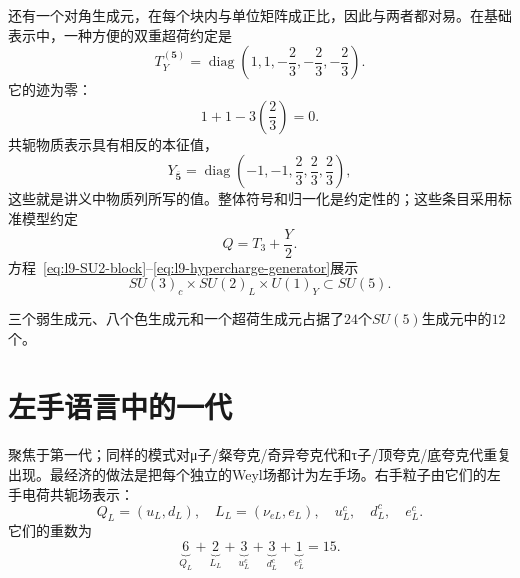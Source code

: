 还有一个对角生成元，在每个块内与单位矩阵成正比，因此与两者都对易。在基础表示中，一种方便的双重超荷约定是
\begin{equation}
T_Y^{(\mathbf5)}=
\operatorname{diag}
\left(
1,1,-\frac23,-\frac23,-\frac23
\right).
\label{eq:l9-hypercharge-generator}
\end{equation}
它的迹为零：
\begin{equation}
1+1-3\left(\frac23\right)=0.
\end{equation}
共轭物质表示具有相反的本征值，
\begin{equation}
Y_{\overline{\mathbf5}}
=
\operatorname{diag}
\left(
-1,-1,\frac23,\frac23,\frac23
\right),
\label{eq:l9-fivebar-hypercharge}
\end{equation}
这些就是讲义中物质列所写的值。整体符号和归一化是约定性的；这些条目采用标准模型约定
\begin{equation}
Q=T_3+\frac{Y}{2}.
\label{eq:l9-charge}
\end{equation}
方程~\eqref{eq:l9-SU2-block}--\eqref{eq:l9-hypercharge-generator}展示
\begin{equation}
SU(3)_c\times SU(2)_L\times U(1)_Y
\subset SU(5).
\end{equation}

三个弱生成元、八个色生成元和一个超荷生成元占据了\(24\)个\(SU(5)\)生成元中的\(12\)个。

\begin{classroomqa}
\end{classroomqa}

\section{左手语言中的一代}

聚焦于第一代；同样的模式对{\proseunicodefont μ}子/粲夸克/奇异夸克代和{\proseunicodefont τ}子/顶夸克/底夸克代重复出现。最经济的做法是把每个独立的Weyl场都计为左手场。右手粒子由它们的左手电荷共轭场表示：
\begin{equation}
Q_L=(u_L,d_L),\quad
L_L=(\nu_{eL},e_L),\quad
u^c_L,\quad d^c_L,\quad e^c_L.
\end{equation}
它们的重数为
\begin{equation}
\underbrace{6}_{Q_L}
+
\underbrace{2}_{L_L}
+
\underbrace{3}_{u^c_L}
+
\underbrace{3}_{d^c_L}
+
\underbrace{1}_{e^c_L}
=15.
\label{eq:l9-fifteen-fields}
\end{equation}

